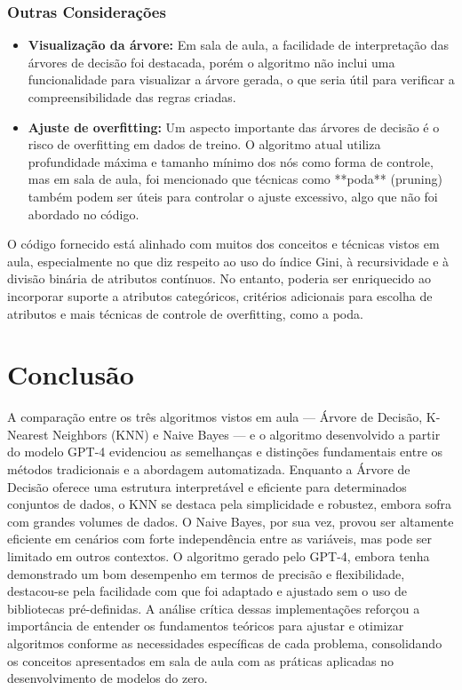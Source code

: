 \documentclass[12pt]{article}
\begin{document}
\subsubsection*{Outras Considerações}

\begin{itemize}
    \item \textbf{Visualização da árvore:} Em sala de aula, a facilidade de interpretação das árvores de decisão foi destacada, porém o algoritmo não inclui uma funcionalidade para visualizar a árvore gerada, o que seria útil para verificar a compreensibilidade das regras criadas.
    
    \item \textbf{Ajuste de overfitting:} Um aspecto importante das árvores de decisão é o risco de overfitting em dados de treino. O algoritmo atual utiliza profundidade máxima e tamanho mínimo dos nós como forma de controle, mas em sala de aula, foi mencionado que técnicas como **poda** (pruning) também podem ser úteis para controlar o ajuste excessivo, algo que não foi abordado no código.
\end{itemize}

O código fornecido está alinhado com muitos dos conceitos e técnicas vistos em aula, especialmente no que diz respeito ao uso do índice Gini, à recursividade e à divisão binária de atributos contínuos. No entanto, poderia ser enriquecido ao incorporar suporte a atributos categóricos, critérios adicionais para escolha de atributos e mais técnicas de controle de overfitting, como a poda.




\section{Conclusão}

\label{sec:conclusao}

    A comparação entre os três algoritmos vistos em aula — Árvore de Decisão, K-Nearest Neighbors (KNN) e Naive Bayes — e o algoritmo desenvolvido a partir do modelo GPT-4 evidenciou as semelhanças e distinções fundamentais entre os métodos tradicionais e a abordagem automatizada. Enquanto a Árvore de Decisão oferece uma estrutura interpretável e eficiente para determinados conjuntos de dados, o KNN se destaca pela simplicidade e robustez, embora sofra com grandes volumes de dados. O Naive Bayes, por sua vez, provou ser altamente eficiente em cenários com forte independência entre as variáveis, mas pode ser limitado em outros contextos. O algoritmo gerado pelo GPT-4, embora tenha demonstrado um bom desempenho em termos de precisão e flexibilidade, destacou-se pela facilidade com que foi adaptado e ajustado sem o uso de bibliotecas pré-definidas. A análise crítica dessas implementações reforçou a importância de entender os fundamentos teóricos para ajustar e otimizar algoritmos conforme as necessidades específicas de cada problema, consolidando os conceitos apresentados em sala de aula com as práticas aplicadas no desenvolvimento de modelos do zero.
    
\end{document}

